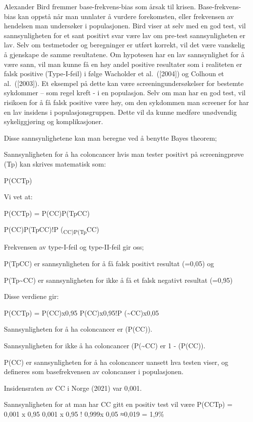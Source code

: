 \documentclass[
  letterpaper,
  DIV=11,
  numbers=noendperiod]{scrreprt}
\begin{document}
Alexander Bird fremmer base-frekvens-bias som årsak til krisen.
Base-frekvens-bias kan oppstå når man unnlater å vurdere forekomsten,
eller frekvensen av hendelsen man undersøker i populasjonen. Bird viser
at selv med en god test, vil sannsynligheten for et sant positivt svar
være lav om pre-test sannsynligheten er lav. Selv om testmetoder og
beregninger er utført korrekt, vil det være vanskelig å gjenskape de
samme resultatene. Om hypotesen har en lav sannsynlighet for å være
sann, vil man kunne få en høy andel positive resultater som i realiteten
er falsk positive (Type-I-feil) i følge Wacholder et al.~({[}2004{]}) og
Colhoun et al.~({[}2003{]}). Et eksempel på dette kan være
screeningundersøkelser for bestemte sykdommer -- som regel kreft - i en
populasjon. Selv om man har en god test, vil risikoen for å få falsk
positive være høy, om den sykdommen man screener for har en lav insidens
i populasjonsgruppen. Dette vil da kunne medføre unødvendig
sykeliggjøring og komplikasjoner.

Disse sannsynlighetene kan man beregne ved å benytte Bayes theorem;

Sannsynligheten for å ha coloncancer hvis man tester positivt på
screeningprøve (Tp) kan skrives matematisk som:

P(CC\textbar Tp)

Vi vet at:

P(CC\textbar Tp) = P(CC)P(Tp\textbar CC)

P(CC)P(Tp\textbar CC)!P (\textsubscript{CC)P(Tp\textbar{}}CC)

Frekvensen av type-I-feil og type-II-feil gir oss;

P(Tp\textbar CC) er sannsynligheten for å få falsk positivt resultat
(=0,05) og

P(Tp\textbar\textasciitilde CC) er sannsynligheten for ikke å få et
falsk negativt resultat (=0,95)

Disse verdiene gir:

P(CC\textbar Tp) = P(CC)x0,95 P(CC)x0,95!P (\textasciitilde CC)x0,05

Sannsynligheten for å ha coloncancer er (P(CC)).

Sannsynligheten for ikke å ha coloncancer (P(\textasciitilde CC) er 1 -
(P(CC)).

P(CC) er sannsynligheten for å ha coloncancer uansett hva testen viser,
og defineres som basefrekvensen av coloncanser i populasjonen.

Insidensraten av CC i Norge (2021) var 0,001.

Sannsynligheten for at man har CC gitt en positiv test vil være
P(CC\textbar Tp) = 0,001 x 0,95 0,001 x 0,95 ! 0,999x 0,05 ≈0,019 =
1,9\%
\end{document}
